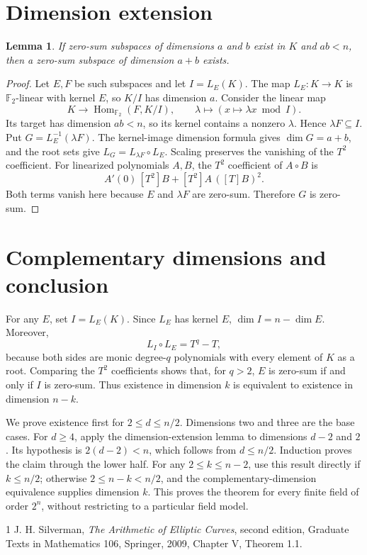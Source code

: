 \documentclass[11pt]{amsart}
\newtheorem{lemma}{Lemma}
\begin{document}
\section{Dimension extension}
\begin{lemma}
If zero-sum subspaces of dimensions $a$ and $b$ exist in $K$ and $ab<n$, then a zero-sum subspace of dimension $a+b$ exists.
\end{lemma}
\begin{proof}
Let $E,F$ be such subspaces and let $I=L_E(K)$. The map $L_E:K\to K$ is $\mathbb F_2$-linear with kernel $E$, so $K/I$ has dimension $a$. Consider the linear map
\[
K\longrightarrow\operatorname{Hom}_{\mathbb F_2}(F,K/I),\qquad
\lambda\longmapsto(x\mapsto\lambda x\bmod I).
\]
Its target has dimension $ab<n$, so its kernel contains a nonzero $\lambda$. Hence $\lambda F\subseteq I$. Put $G=L_E^{-1}(\lambda F)$. The kernel-image dimension formula gives $\dim G=a+b$, and the root sets give $L_G=L_{\lambda F}\circ L_E$. Scaling preserves the vanishing of the $T^2$ coefficient. For linearized polynomials $A,B$, the $T^2$ coefficient of $A\circ B$ is
\[
A'(0)\,[T^2]B+[T^2]A\,( [T]B)^2.
\]
Both terms vanish here because $E$ and $\lambda F$ are zero-sum. Therefore $G$ is zero-sum.
\end{proof}

\section{Complementary dimensions and conclusion}
For any $E$, set $I=L_E(K)$. Since $L_E$ has kernel $E$, $\dim I=n-\dim E$. Moreover,
\[
L_I\circ L_E=T^q-T,
\]
because both sides are monic degree-$q$ polynomials with every element of $K$ as a root. Comparing the $T^2$ coefficients shows that, for $q>2$, $E$ is zero-sum if and only if $I$ is zero-sum. Thus existence in dimension $k$ is equivalent to existence in dimension $n-k$.

We prove existence first for $2\le d\le n/2$. Dimensions two and three are the base cases. For $d\ge4$, apply the dimension-extension lemma to dimensions $d-2$ and $2$. Its hypothesis is $2(d-2)<n$, which follows from $d\le n/2$. Induction proves the claim through the lower half. For any $2\le k\le n-2$, use this result directly if $k\le n/2$; otherwise $2\le n-k<n/2$, and the complementary-dimension equivalence supplies dimension $k$. This proves the theorem for every finite field of order $2^n$, without restricting to a particular field model.

\begin{thebibliography}{1}
 J. H. Silverman, \emph{The Arithmetic of Elliptic Curves}, second edition, Graduate Texts in Mathematics 106, Springer, 2009, Chapter V, Theorem 1.1.
\end{thebibliography}
\end{document}
